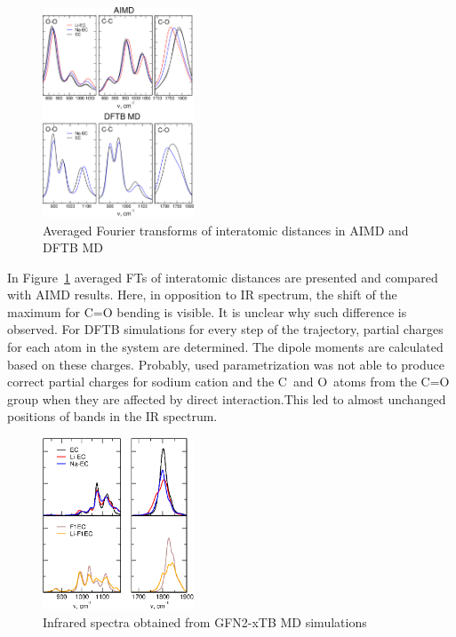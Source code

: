 \begin{figure}[ht]
    \centering
    \includegraphics[width=0.4\textwidth]{img/5-alternatives-to-aimd/1-carbonates/ft-averages.png}
    \caption{Averaged Fourier transforms of interatomic distances in AIMD and DFTB MD}
    \label{fig:dftb-carbonates-ft-averages}
\end{figure}

In Figure~\ref{fig:dftb-carbonates-ft-averages} averaged FTs of interatomic distances are presented and compared with AIMD results. Here, in opposition to IR spectrum, the shift of the maximum for C=O bending is visible. It is unclear why such difference is observed. For DFTB simulations for every step of the trajectory, partial charges for each atom in the system are determined. The dipole moments are calculated based on these charges. Probably, used parametrization was not able to produce correct partial charges for sodium cation and the C~and O~atoms from the C=O group when they are affected by direct interaction.This led to almost unchanged positions of bands in the IR spectrum.

\begin{figure}[ht]
    \centering
    \includegraphics[width=0.4\textwidth]{img/5-alternatives-to-aimd/1-carbonates/xtb.png}
    \caption{Infrared spectra obtained from GFN2-xTB MD simulations}
    \label{fig:dftb-carbonates-xtb}
\end{figure}

